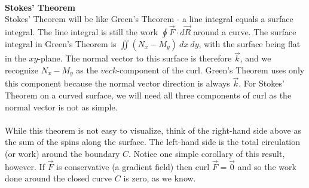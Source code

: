\\

\noindent\textbf{\large Stokes' Theorem}\\

Stokes' Theorem will be like Green's Theorem - a line integral equals a surface integral. The line integral is still the work $\displaystyle\oint \vec F \cdot d\vec R$ around a curve.  The surface integral in Green's Theorem is $\displaystyle\iint (N_x - M_y) \: dx \: dy$, with the surface being flat in the $xy$-plane. The normal vector to this surface is therefore $\vec k$, and we recognize $N_x - M_y$ as the $vec k$-component of the curl.  Green's Theorem uses only this component because the normal vector direction is always $\vec k$.  For Stokes' Theorem on a curved surface, we will need all three components of curl as the normal vector is not as simple.\\

\\

While this theorem is not easy to visualize, think of the right-hand side above as the sum of the spins along the surface.  The left-hand side is the total circulation (or work) around the boundary $C$.  Notice one simple corollary of this result, however.  If $\vec F$ is conservative (a gradient field) then $\text{curl } \vec F = \vec 0$ and so the work done around the closed curve $C$ is zero, as we know.\\

